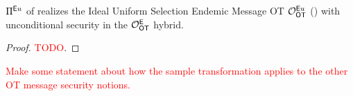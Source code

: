 \begin{lemma}
	$\Pi^{\mathsf{E} u}$ of  realizes the  Ideal Uniform Selection Endemic Message OT $\mathcal{O}_{\mathsf{OT}}^{\mathsf{E} u}$ () with unconditional security in the $\mathcal{O}_{\mathsf{OT}}^{\mathsf{E}}$ hybrid.
\end{lemma}


\begin{proof}
	\textcolor{red}{TODO}.
\end{proof}

\begin{remark}
	\textcolor{red}{Make some statement about how the sample transformation applies to the other OT message security notions.}
\end{remark}
